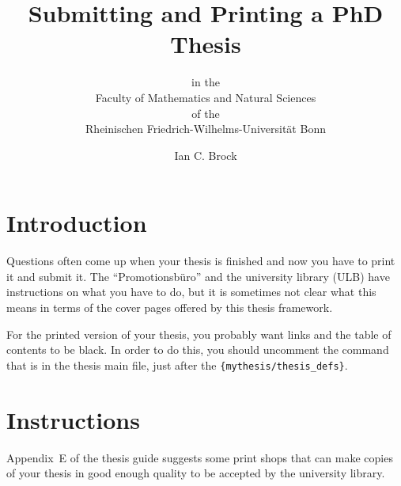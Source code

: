 \documentclass[a4paper,twoside,ngerman,UKenglish]{scrartcl}
\begin{document}
\title{Submitting and Printing a PhD Thesis}
\subtitle{\vspace*{4ex}
    in the\\
    Faculty of Mathematics and Natural Sciences\\
    of the\\
    Rheinischen Friedrich-Wilhelms-Universität Bonn
}
\author{Ian C. Brock}
\maketitle

\section{Introduction}
Questions often come up when your thesis is finished and now you have
to print it and submit it. The \foreignquote{ngerman}{Promotionsbüro}
and the university library (ULB) have instructions on what you have to
do, but it is sometimes not clear what this means in terms of the
cover pages offered by this thesis framework.

For the printed version of your thesis, you probably want
 links and the table of contents to be black. In
order to do this, you should uncomment the  command
that is in the thesis main file, just after the
\texttt{\{mythesis/thesis\_defs\}}.

\section{Instructions}


Appendix~E of the thesis guide suggests some print
shops that can make copies of your thesis in good enough quality to be
accepted by the university library.
\end{document}
